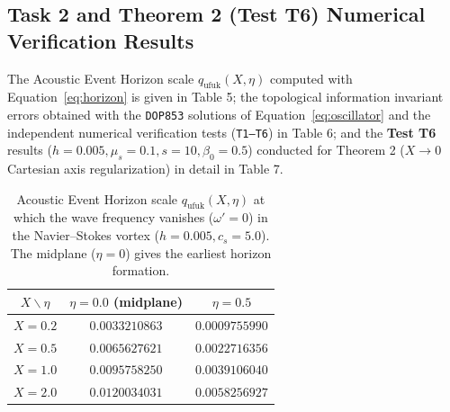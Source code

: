\documentclass[12pt,a4paper]{article}
\begin{document}
\subsection{Task 2 and Theorem 2 (Test T6) Numerical Verification Results}

The Acoustic Event Horizon scale $q_{\mathrm{ufuk}}(X, \eta)$ computed with Equation~\eqref{eq:horizon} is given in Table 5; the topological information invariant errors obtained with the \texttt{DOP853} solutions of Equation~\eqref{eq:oscillator} and the independent numerical verification tests (\texttt{T1--T6}) in Table 6; and the \textbf{Test T6} results ($h = 0.005, \mu_s = 0.1, s = 10, \beta_0 = 0.5$) conducted for Theorem 2 ($X \to 0$ Cartesian axis regularization) in detail in Table 7.

\begin{table}[htbp]
\centering
\caption{Acoustic Event Horizon scale $q_{\mathrm{ufuk}}(X, \eta)$ at which the wave frequency vanishes ($\omega' = 0$) in the Navier--Stokes vortex ($h=0.005, c_s=5.0$). The midplane ($\eta=0$) gives the earliest horizon formation.}
\vspace{0.15cm}
\begin{tabular}{c|cc}
\hline
$X \backslash \eta$ & $\eta = 0.0$ (midplane) & $\eta = 0.5$ \\
\hline
$X = 0.2$ & $0.0033210863$ & $0.0009755990$ \\
$X = 0.5$ & $0.0065627621$ & $0.0022716356$ \\
$X = 1.0$ & $0.0095758250$ & $0.0039106040$ \\
$X = 2.0$ & $0.0120034031$ & $0.0058256927$ \\
\hline
\end{tabular}
\end{table}
\end{document}

